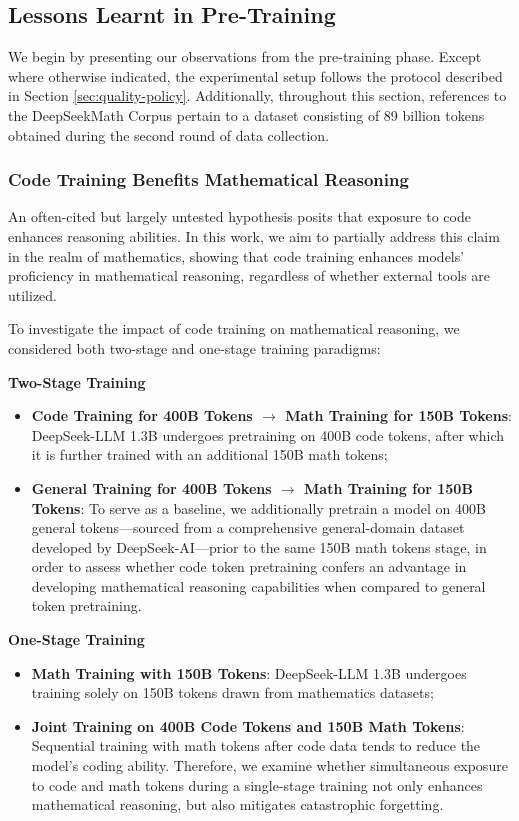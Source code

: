 \begin{itemize}[topsep=0pt]
\subsection{Lessons Learnt in Pre-Training}

We begin by presenting our observations from the pre-training phase. Except where otherwise indicated, the experimental setup follows the protocol described in Section \ref{sec:quality-policy}. Additionally, throughout this section, references to the DeepSeekMath Corpus pertain to a dataset consisting of 89 billion tokens obtained during the second round of data collection.

\subsubsection{Code Training Benefits Mathematical Reasoning}

An often-cited but largely untested hypothesis posits that exposure to code enhances reasoning abilities. In this work, we aim to partially address this claim in the realm of mathematics, showing that code training enhances models’ proficiency in mathematical reasoning, regardless of whether external tools are utilized.

To investigate the impact of code training on mathematical reasoning, we considered both two-stage and one-stage training paradigms:

\textbf{Two-Stage Training}

\begin{itemize}[topsep=0pt]
    \item \textbf{Code Training for 400B Tokens $\rightarrow$ Math Training for 150B Tokens}: DeepSeek-LLM 1.3B undergoes pretraining on 400B code tokens, after which it is further trained with an additional 150B math tokens;
    \item \textbf{General Training for 400B Tokens $\rightarrow$ Math Training for 150B Tokens}: To serve as a baseline, we additionally pretrain a model on 400B general tokens—sourced from a comprehensive general-domain dataset developed by DeepSeek-AI—prior to the same 150B math tokens stage, in order to assess whether code token pretraining confers an advantage in developing mathematical reasoning capabilities when compared to general token pretraining.
\end{itemize}

\textbf{One-Stage Training}

\begin{itemize}[topsep=0pt]
    \item \textbf{Math Training with 150B Tokens}: DeepSeek-LLM 1.3B undergoes training solely on 150B tokens drawn from mathematics datasets;
    \item \textbf{Joint Training on 400B Code Tokens and 150B Math Tokens}: Sequential training with math tokens after code data tends to reduce the model’s coding ability. Therefore, we examine whether simultaneous exposure to code and math tokens during a single-stage training not only enhances mathematical reasoning, but also mitigates catastrophic forgetting.
\end{itemize}


\end{itemize}
